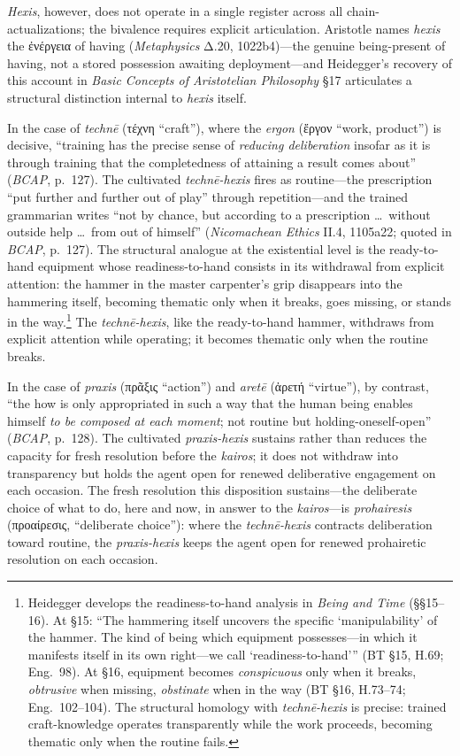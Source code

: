 \documentclass{article}
\newcommand{\gk}[1]{{\greekfont #1}}
\begin{document}
\textit{Hexis}, however, does not operate in a single register across all chain-actualizations; the bivalence requires explicit articulation. Aristotle names \textit{hexis} the \gk{ἐνέργεια} of having (\textit{Metaphysics} Δ.20, 1022b4)---the genuine being-present of having, not a stored possession awaiting deployment---and Heidegger's recovery of this account in \textit{Basic Concepts of Aristotelian Philosophy} \S17 articulates a structural distinction internal to \textit{hexis} itself.

In the case of \textit{technē} (\gk{τέχνη} ``craft''), where the \textit{ergon} (\gk{ἔργον} ``work, product'') is decisive, ``training has the precise sense of \textit{reducing deliberation} insofar as it is through training that the completedness of attaining a result comes about'' (\textit{BCAP}, p.~127). The cultivated \textit{technē-hexis} fires as routine---the prescription ``put further and further out of play'' through repetition---and the trained grammarian writes ``not by chance, but according to a prescription \ldots\ without outside help \ldots\ from out of himself'' (\textit{Nicomachean Ethics} II.4, 1105a22; quoted in \textit{BCAP}, p.~127). The structural analogue at the existential level is the ready-to-hand equipment whose readiness-to-hand consists in its withdrawal from explicit attention: the hammer in the master carpenter's grip disappears into the hammering itself, becoming thematic only when it breaks, goes missing, or stands in the way.\footnote{Heidegger develops the readiness-to-hand analysis in \textit{Being and Time} (\S\S15--16). At \S15: ``The hammering itself uncovers the specific `manipulability' of the hammer. The kind of being which equipment possesses---in which it manifests itself in its own right---we call `readiness-to-hand''' (BT \S15, H.69; Eng.~98). At \S16, equipment becomes \textit{conspicuous} only when it breaks, \textit{obtrusive} when missing, \textit{obstinate} when in the way (BT \S16, H.73--74; Eng.~102--104). The structural homology with \textit{technē-hexis} is precise: trained craft-knowledge operates transparently while the work proceeds, becoming thematic only when the routine fails.} The \textit{technē-hexis}, like the ready-to-hand hammer, withdraws from explicit attention while operating; it becomes thematic only when the routine breaks.

In the case of \textit{praxis} (\gk{πρᾶξις} ``action'') and \textit{aretē} (\gk{ἀρετή} ``virtue''), by contrast, ``the how is only appropriated in such a way that the human being enables himself \textit{to be composed at each moment}; not routine but holding-oneself-open'' (\textit{BCAP}, p.~128). The cultivated \textit{praxis-hexis} sustains rather than reduces the capacity for fresh resolution before the \textit{kairos}; it does not withdraw into transparency but holds the agent open for renewed deliberative engagement on each occasion. The fresh resolution this disposition sustains---the deliberate choice of what to do, here and now, in answer to the \textit{kairos}---is \textit{prohairesis} (\gk{προαίρεσις}, ``deliberate choice''): where the \textit{techn\=e-hexis} contracts deliberation toward routine, the \textit{praxis-hexis} keeps the agent open for renewed prohairetic resolution on each occasion.
\end{document}
